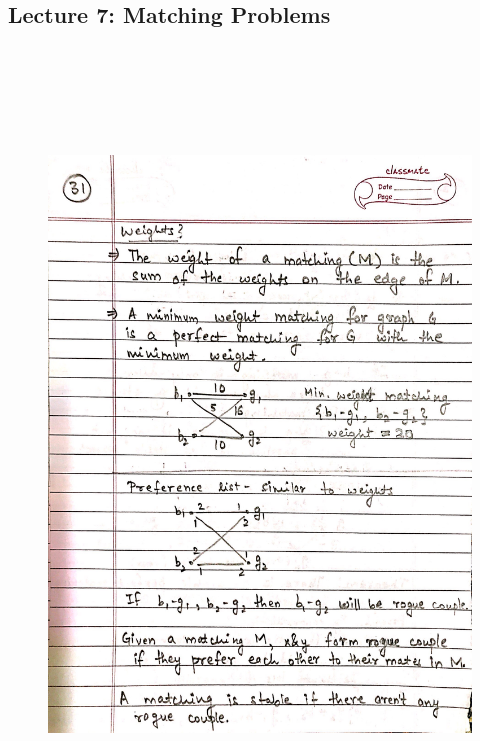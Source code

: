 \newpage
{\color{black} \subsection*{Lecture 7: Matching Problems}}
\begin{figure}[H]
    \centering
    \includegraphics[width=16cm, height=21cm]{"./MIT-6.042J/MIT-6042J-031"}
\end{figure}

